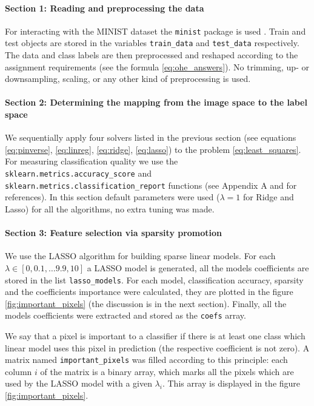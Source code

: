 \documentclass{article}
\begin{document}
\paragraph{Section 1: Reading and preprocessing the data} For interacting with the MINIST dataset the \texttt{minist}  package is used \cite{ministpython}. Train and test objects are stored in the variables \texttt{train\_data} and \texttt{test\_data} respectively. The data and class labels are then preprocessed and reshaped according to the assignment requirements (see the formula \ref{eq:ohe_answers}). No trimming, up- or downsampling, scaling, or any other kind of preprocessing is used.
 
\paragraph{Section 2: Determining the mapping from the image space to the label space} 
    We sequentially apply four solvers listed in the previous section (see equations \ref{eq:pinverse}, \ref{eq:linreg}, \ref{eq:ridge}, \ref{eq:lasso}) to the problem \ref{eq:least_squares}. For measuring classification quality we use the \texttt{sklearn.metrics.accuracy\_score} and \texttt{sklearn.metrics.classification\_report} functions (see Appendix A and \cite{classificationreport} for references). In this section default parameters were used ($\lambda = 1$ for Ridge and Lasso) for all the algorithms, no extra tuning was made.
\paragraph{Section 3: Feature selection via sparsity promotion} We use the LASSO algorithm for building sparse linear models. For each $\lambda \in [0, 0.1, \dots 9.9, 10]$ a LASSO model is generated, all the models coefficients are stored in the list \texttt{lasso\_models}. For each model, classification accuracy, sparsity and the coefficients importance were calculated, they are plotted in the figure \ref{fig:important_pixels} (the discussion is in the next section). Finally, all the models coefficients were extracted  and stored as the \texttt{coefs} array. 

    We say that a pixel is important to a classifier if there is at least one class which linear model uses this pixel in prediction (the respective coefficient is not zero). A matrix named \texttt{important\_pixels} was filled according to this principle: each column $i$ of the matrix is a binary array, which marks all the pixels which are used by the LASSO model with a given $\lambda_i$. This array is displayed in the figure \ref{fig:important_pixels}. 
    
\end{document}
